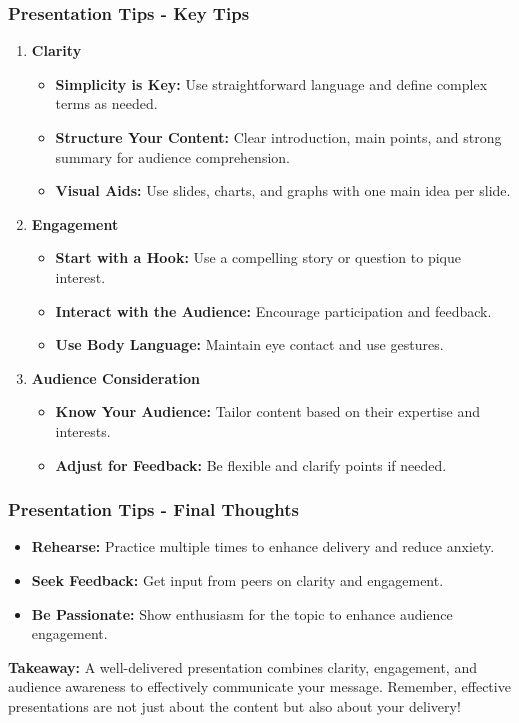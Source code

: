 \documentclass[aspectratio=169]{beamer}
\begin{document}
\begin{frame}[fragile]
    \frametitle{Presentation Tips - Key Tips}
    \begin{enumerate}
        \item \textbf{Clarity}
        \begin{itemize}
            \item \textbf{Simplicity is Key:} Use straightforward language and define complex terms as needed.
            \item \textbf{Structure Your Content:} Clear introduction, main points, and strong summary for audience comprehension.
            \item \textbf{Visual Aids:} Use slides, charts, and graphs with one main idea per slide.
        \end{itemize}
        \item \textbf{Engagement}
        \begin{itemize}
            \item \textbf{Start with a Hook:} Use a compelling story or question to pique interest.
            \item \textbf{Interact with the Audience:} Encourage participation and feedback.
            \item \textbf{Use Body Language:} Maintain eye contact and use gestures.
        \end{itemize}
        \item \textbf{Audience Consideration}
        \begin{itemize}
            \item \textbf{Know Your Audience:} Tailor content based on their expertise and interests.
            \item \textbf{Adjust for Feedback:} Be flexible and clarify points if needed.
        \end{itemize}
    \end{enumerate}
\end{frame}

\begin{frame}[fragile]
    \frametitle{Presentation Tips - Final Thoughts}
    \begin{itemize}
        \item \textbf{Rehearse:} Practice multiple times to enhance delivery and reduce anxiety.
        \item \textbf{Seek Feedback:} Get input from peers on clarity and engagement.
        \item \textbf{Be Passionate:} Show enthusiasm for the topic to enhance audience engagement.
    \end{itemize}
    
    \textbf{Takeaway:} A well-delivered presentation combines clarity, engagement, and audience awareness to effectively communicate your message. Remember, effective presentations are not just about the content but also about your delivery!
\end{frame}
\end{document}
